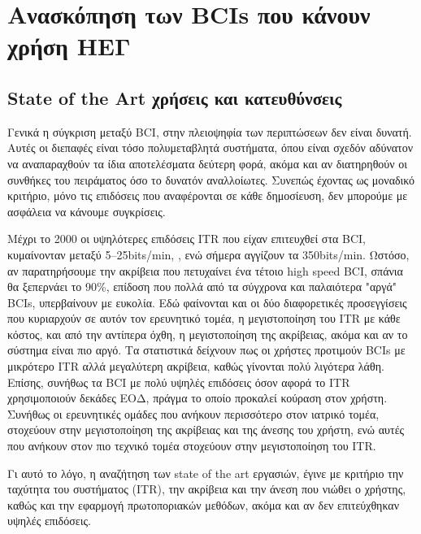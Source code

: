 \documentclass[11pt,a4paper,english,greek,twoside]{../Thesis}
\begin{document}
\chapter{Ανασκόπηση των BCIs που κάνουν χρήση ΗΕΓ} \label{chap:survey}

\section{State of the Art χρήσεις και κατευθύνσεις}

\par Γενικά η σύγκριση μεταξύ BCI, στην πλειοψηφία των περιπτώσεων δεν είναι δυνατή. Αυτές οι διεπαφές είναι τόσο πολυμεταβλητά συστήματα, όπου είναι σχεδόν αδύνατον να αναπαραχθούν τα ίδια αποτελέσματα δεύτερη φορά, ακόμα και αν διατηρηθούν οι συνθήκες του πειράματος όσο το δυνατόν αναλλοίωτες. Συνεπώς έχοντας ως μοναδικό κριτήριο, μόνο τις επιδόσεις που αναφέρονται σε κάθε δημοσίευση, δεν μπορούμε με ασφάλεια να κάνουμε συγκρίσεις. 

\par  Μέχρι το 2000 οι υψηλότερες επιδόσεις ITR που είχαν επιτευχθεί στα BCI, κυμαίνονταν μεταξύ 5–25bits/min, \cite{wolpaw2000brain}, ενώ σήμερα αγγίζουν τα 350bits/min. Ωστόσο, αν παρατηρήσουμε την ακρίβεια που πετυχαίνει ένα τέτοιο high speed BCI, σπάνια θα ξεπερνάει το 90\%, επίδοση που πολλά από τα σύγχρονα και παλαιότερα "αργά" BCIs, υπερβαίνουν με ευκολία. Εδώ φαίνονται και οι δύο διαφορετικές προσεγγίσεις που κυριαρχούν σε αυτόν τον ερευνητικό τομέα, η μεγιστοποίηση του ITR με κάθε κόστος, και από την αντίπερα όχθη, η μεγιστοποίηση της ακρίβειας, ακόμα και αν το σύστημα είναι πιο αργό. Τα στατιστικά δείχνουν πως οι χρήστες προτιμούν BCIs με μικρότερο ITR αλλά μεγαλύτερη ακρίβεια, καθώς γίνονται πολύ λιγότερα λάθη. Επίσης, συνήθως τα BCI με πολύ υψηλές επιδόσεις όσον αφορά το ITR χρησιμοποιούν δεκάδες ΕΟΔ, πράγμα το οποίο προκαλεί κούραση στον χρήστη. Συνήθως οι ερευνητικές ομάδες που ανήκουν περισσότερο στον ιατρικό τομέα, στοχεύουν στην μεγιστοποίηση της ακρίβειας και της άνεσης του χρήστη, ενώ αυτές που ανήκουν στον πιο τεχνικό τομέα στοχεύουν στην μεγιστοποίηση του ITR. 

\par Γι αυτό το λόγο, η αναζήτηση των state of the art εργασιών, έγινε με κριτήριο την ταχύτητα του συστήματος (ITR), την ακρίβεια και την άνεση που νιώθει ο χρήστης, καθώς και την εφαρμογή πρωτοποριακών μεθόδων, ακόμα και αν δεν επιτεύχθηκαν υψηλές επιδόσεις.
\end{document}
